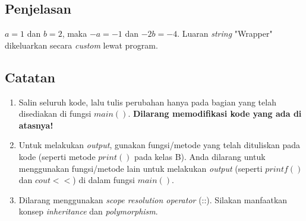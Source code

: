 \documentclass{article}
\begin{document}
\subsection*{Penjelasan}

\(a = 1\) dan \(b = 2\), maka \(-a = -1\) dan \(-2b = -4\). Luaran \textit{string} "Wrapper" dikeluarkan secara \textit{custom} lewat program.

\subsection*{Catatan}

\begin{enumerate}
    \item Salin seluruh kode, lalu tulis perubahan hanya pada bagian yang telah disediakan di fungsi \(main()\). \textbf{Dilarang memodifikasi kode yang ada di atasnya!}
    \item Untuk melakukan \textit{output}, gunakan fungsi/metode yang telah dituliskan pada kode (seperti metode \(print()\) pada kelas B). Anda dilarang untuk menggunakan fungsi/metode lain untuk melakukan \textit{output} (seperti \(printf()\) dan \(cout <<\)) di dalam fungsi \(main()\). 
    \item Dilarang menggunakan \textit{scope resolution operator} (::). Silakan manfaatkan konsep \textit{inheritance} dan \textit{polymorphism}.
\end{enumerate}
\end{document}
